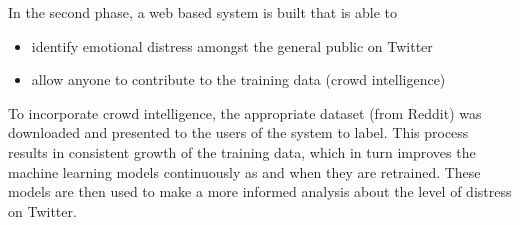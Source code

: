 In the second phase, a web based system is built that is able to
\begin{itemize}
    \item{identify emotional distress amongst the general public on Twitter}
    \item{allow anyone to contribute to the training data (crowd intelligence)}
\end{itemize}
To incorporate crowd intelligence, the appropriate dataset (from Reddit) was downloaded and presented to the users of the system to label. This process results in consistent growth of the training data, which in turn improves the machine learning models continuously as and when they are retrained. These models are then used to make a more informed analysis about the level of distress on Twitter.
